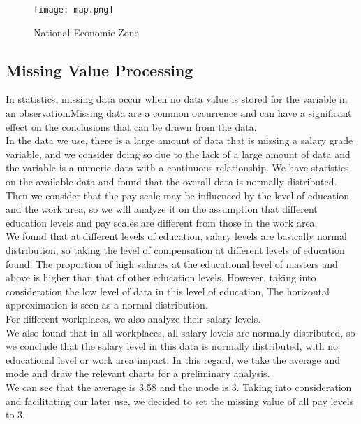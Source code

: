 \documentclass{mcmthesis}
\begin{document}
\begin{figure}
\centering
\texttt{[image: map.png]}
\caption{National Economic Zone} \label{fig:National Economic Zone}
\end{figure}
\newpage

\subsection{Missing Value Processing}

In statistics, missing data occur when no data value is stored for the variable in an observation.Missing data are a common occurrence and can have a significant effect on the conclusions that can be drawn from the data.\\
\newline
In the data we use, there is a large amount of data that is missing a salary grade variable, and we consider doing so due to the lack of a large amount of data and the variable is a numeric data with a continuous relationship. We have statistics on the available data and found that the overall data is normally distributed.\\

Then we consider that the pay scale may be influenced by the level of education and the work area, so we will analyze it on the assumption that different education levels and pay scales are different from those in the work area.\\
We found that at different levels of education, salary levels are basically normal distribution, so taking the level of compensation at different levels of education found. The proportion of high salaries at the educational level of masters and above is higher than that of other education levels. However, taking into consideration the low level of data in this level of education, The horizontal approximation is seen as a normal distribution.\\
\newline
For different workplaces, we also analyze their salary levels.\\
We also found that in all workplaces, all salary levels are normally distributed, so we conclude that the salary level in this data is normally distributed, with no educational level or work area impact.
\newline
In this regard, we take the average and mode and draw the relevant charts for a preliminary analysis.\\
We can see that the average is 3.58 and the mode is 3. Taking into consideration and facilitating our later use, we decided to set the missing value of all pay levels to 3.\\
\end{document}
